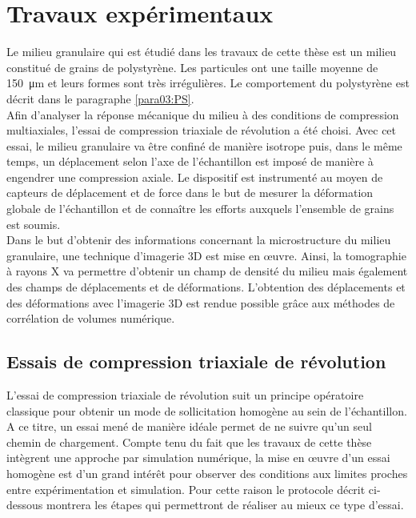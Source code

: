 \graphicspath{{./04-Experimentale/images/}}

\chapter{Travaux expérimentaux}
\label{chap:experimental}
	Le milieu granulaire qui est étudié dans les travaux de cette thèse est un milieu constitué de grains de polystyrène. Les particules ont une taille moyenne de \SI{150}{\micro\meter} et leurs formes sont très irrégulières. Le comportement du polystyrène est décrit dans le paragraphe \ref{para03:PS}.
	\\Afin d'analyser la réponse mécanique du milieu à des conditions de compression multiaxiales, l'essai de compression triaxiale de révolution a été choisi. Avec cet essai, le milieu granulaire va être confiné de manière isotrope puis, dans le même temps, un déplacement selon l'axe de l'échantillon est imposé de manière à engendrer une compression axiale. Le dispositif est instrumenté au moyen de capteurs de déplacement et de force dans le but de mesurer la déformation globale de l'échantillon et de connaître les efforts auxquels l'ensemble de grains est soumis.
	\\Dans le but d'obtenir des informations concernant la microstructure du milieu granulaire, une technique d'imagerie 3D est mise en \oe{}uvre. Ainsi, la tomographie à rayons X va permettre d'obtenir un champ de densité du milieu mais également des champs de déplacements et de déformations. L'obtention des déplacements et des déformations avec l'imagerie 3D est rendue possible grâce aux méthodes de corrélation de volumes numérique.

\section{Essais de compression triaxiale de révolution}
	L’essai de compression triaxiale de révolution suit un principe opératoire classique pour obtenir un mode de sollicitation homogène au sein de l’échantillon. A ce titre, un essai mené de manière idéale permet de ne suivre qu'un seul chemin de chargement. Compte tenu du fait que les travaux de cette thèse intègrent une approche par simulation numérique, la mise en \oe{}uvre d’un essai homogène est d’un grand intérêt pour observer des conditions aux limites proches entre expérimentation et simulation. Pour cette raison le protocole décrit ci-dessous montrera les étapes qui permettront de réaliser au mieux ce type d’essai.
